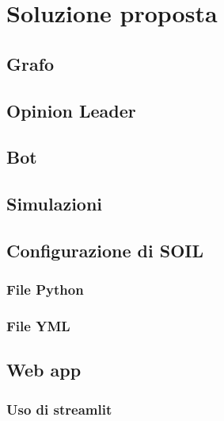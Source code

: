 \section{Soluzione proposta}

    \subsection{Grafo}
    
    \subsection{Opinion Leader}
    
    \subsection{Bot}
    
    \subsection{Simulazioni}
    
    \subsection{Configurazione di SOIL}
    
        \subsubsection{File Python}
    
        \subsubsection{File YML}
    
    \subsection{Web app}
    
        \subsubsection{Uso di streamlit}